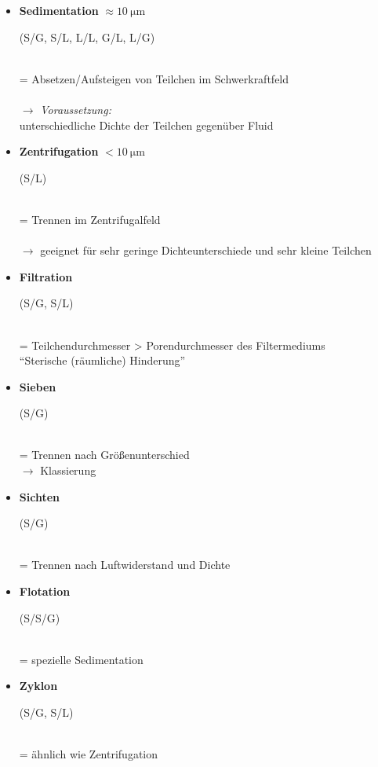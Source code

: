 \begin{itemize}
	\item \textbf{Sedimentation} $\approx \SI{10}{\micro \meter}$ \begin{small}(S/G, S/L, L/L, G/L, L/G)\end{small}\\
	= Absetzen/Aufsteigen von Teilchen im Schwerkraftfeld \\ \\
	$\rightarrow$ \textit{Voraussetzung:} \\
	unterschiedliche Dichte der Teilchen gegenüber Fluid
		
	\item \textbf{Zentrifugation} $< \SI{10}{\micro \meter}$ \begin{small}(S/L)\end{small}\\
	= Trennen im Zentrifugalfeld \\ \\
	$\rightarrow$ geeignet für sehr geringe Dichteunterschiede und sehr kleine Teilchen
	
	\item \textbf{Filtration} \begin{small}(S/G, S/L)\end{small}\\
	= Teilchendurchmesser > Porendurchmesser des Filtermediums \\
	"`Sterische (räumliche) Hinderung"' 
	
	\item \textbf{Sieben} \begin{small}(S/G)\end{small}\\
	= Trennen nach Größenunterschied \\
	$\rightarrow$ Klassierung
	
	\item \textbf{Sichten} \begin{small}(S/G)\end{small}\\
	= Trennen nach Luftwiderstand und Dichte
	
	\item \textbf{Flotation} \begin{small}(S/S/G)\end{small}\\
	= spezielle Sedimentation
	
	\item \textbf{Zyklon} \begin{small}(S/G, S/L)\end{small}\\
	= ähnlich wie Zentrifugation
\end{itemize}

